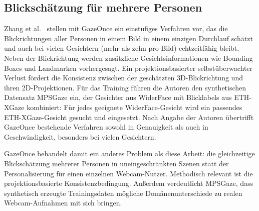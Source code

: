 \documentclass[
  11pt,
  a4paper,
  oneside,
  DIV=12,                 %
  BCOR=8mm,               %
  parskip=half,           %
  headings=normal,
  bibliography=totoc,     %
  listof=totoc            %
]{scrreprt}
\begin{document}
\subsection{Blickschätzung für mehrere Personen}
\label{subsec:gazeonce}
Zhang et al.~\cite{zhang2022gazeonce} stellen mit GazeOnce ein einstufiges Verfahren vor, das die Blickrichtungen aller Personen in einem Bild in einem einzigen Durchlauf schätzt und auch bei vielen Gesichtern (mehr als zehn pro Bild) echtzeitfähig bleibt. Neben der Blickrichtung werden zusätzliche Gesichtsinformationen wie Bounding Boxes und Landmarken vorhergesagt. Ein projektionsbasierter selbstüberwachter Verlust fördert die Konsistenz zwischen der geschätzten 3D-Blickrichtung und ihren 2D-Projektionen. Für das Training führen die Autoren den synthetischen Datensatz MPSGaze ein, der Gesichter aus WiderFace mit Blicklabels aus ETH-XGaze kombiniert: Für jedes geeignete WiderFace-Gesicht wird ein passendes ETH-XGaze-Gesicht gesucht und eingesetzt. Nach Angabe der Autoren übertrifft GazeOnce bestehende Verfahren sowohl in Genauigkeit als auch in Geschwindigkeit, besonders bei vielen Gesichtern.

GazeOnce behandelt damit ein anderes Problem als diese Arbeit: die gleichzeitige Blickschätzung mehrerer Personen in uneingeschränkten Szenen statt der Personalisierung für einen einzelnen Webcam-Nutzer. Methodisch relevant ist die projektionsbasierte Konsistenzbedingung. Außerdem verdeutlicht MPSGaze, dass synthetisch erzeugte Trainingsdaten mögliche Domänenunterschiede zu realen Webcam-Aufnahmen mit sich bringen.
\end{document}
